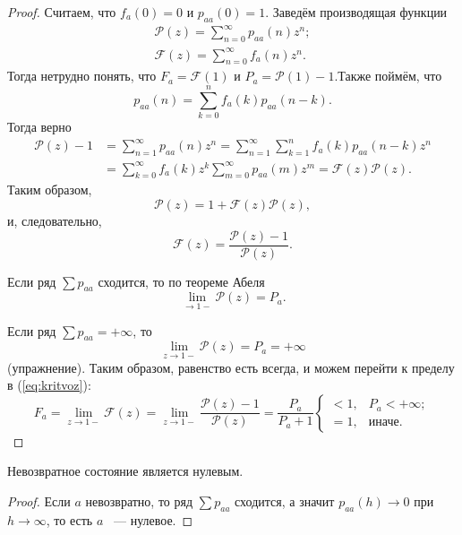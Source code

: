 \begin{proof}
    Считаем, что $f_a(0) = 0 $ и $p_{aa}(0) = 1$. Заведём производящая функции
    \begin{gather*}
        \mathcal{P}(z) = \sum \limits_{n = 0}^{\infty} p_{aa}(n)z^n; \\
    \mathcal{F}(z) =
        \sum \limits_{n = 0}^{\infty} f_a(n)z^n.
    \end{gather*}
    Тогда нетрудно понять, что $F_a = \mathcal{F}(1)$ и $P_a = \mathcal{P}(1) - 1$.Также поймём, что 
    $$p_{aa}(n) = \sum\limits_{k = 0}^{n} f_a(k)p_{aa}(n - k) .$$
   Тогда верно
   \begin{align*}
       \mathcal{P}(z) - 1 &= \sum\limits_{n = 1}^\infty p_{aa}(n)z^n = \sum\limits_{n = 1}^\infty\sum\limits_{k = 1}^n f_a(k)p_{aa}(n - k)z^n \\&=
        \sum\limits_{k = 0}^\infty f_a(k)z^k\sum\limits_{m = 0}^\infty p_{aa}(m)z^m = \mathcal{F}(z)\mathcal{P}(z).
   \end{align*}
    Таким образом,
    $$\mathcal{P}(z) = 1 + \mathcal{F}(z)\mathcal{P}(z),$$
    и, следовательно,
    \begin{equation*}\label{eq:kritvoz}\tag{$*$}
        \mathcal{F}(z) = \frac{\mathcal{P}(z) - 1}{\mathcal{P}(z)}.
    \end{equation*}
  

    Если ряд $\sum p_{aa}$ сходится, то по теореме Абеля
    $$\underset{\to 1-}{\lim} \mathcal{P}(z) =P_a.$$

    Если ряд $\sum p_{aa} = +\infty$, то 
    $$\underset{z\to 1-}{\lim} \mathcal{P}(z) =P_a = +\infty$$
    (упражнение). Таким образом, равенство есть всегда, и можем перейти к пределу в (\ref{eq:kritvoz}):
   $$F_a = \underset{z\to 1-}{\lim} \mathcal{F}(z) = \underset{z\to 1-}{\lim}\frac{\mathcal{P}(z) - 1}{\mathcal{P}(z)} =\frac{P_a}{P_a + 1} \begin{cases}
   < 1, &  P_a < +\infty;\\
   = 1, & \text{иначе}.
   \end{cases}$$

\end{proof}

\begin{corollary}
    Невозвратное состояние является нулевым.
\end{corollary}

\begin{proof}
    Если $a$ невозвратно, то ряд $\sum p_{aa}$ сходится, а значит
    $p_{aa}(h) \to 0$ при $h\to \infty$, то есть $a$ ~--- нулевое.
\end{proof}

